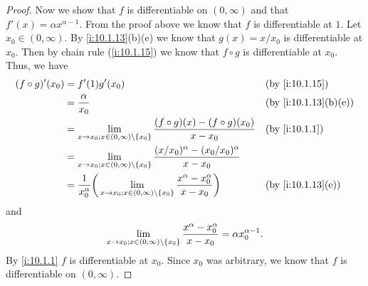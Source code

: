 \begin{proof}
  Now we show that \(f\) is differentiable on \((0, \infty)\) and that \(f'(x) = \alpha x^{\alpha - 1}\).
  From the proof above we know that \(f\) is differentiable at \(1\).
  Let \(x_0 \in (0, \infty)\).
  By \cref{i:10.1.13}(b)(e) we know that \(g(x) = x / x_0\) is differentiable at \(x_0\).
  Then by chain rule (\cref{i:10.1.15}) we know that \(f \circ g\) is differentiable at \(x_0\).
  Thus, we have
  \begin{align*}
    (f \circ g)'(x_0) & = f'(1) g'(x_0)                                                                                                                           &  & \by{i:10.1.15}      \\
                      & = \dfrac{\alpha}{x_0}                                                                                                                     &  & \by{i:10.1.13}[b,e] \\
                      & = \lim_{x \to x_0 ; x \in (0, \infty) \setminus \set{x_0}} \dfrac{(f \circ g)(x) - (f \circ g)(x_0)}{x - x_0}                             &  & \by{i:10.1.1}       \\
                      & = \lim_{x \to x_0 ; x \in (0, \infty) \setminus \set{x_0}} \dfrac{(x / x_0)^{\alpha} - (x_0 / x_0)^{\alpha}}{x - x_0}                                              \\
                      & = \dfrac{1}{x_0^{\alpha}} \bigg(\lim_{x \to x_0 ; x \in (0, \infty) \setminus \set{x_0}} \dfrac{x^{\alpha} - x_0^{\alpha}}{x - x_0}\bigg) &  & \by{i:10.1.13}[e]
  \end{align*}
  and
  \[
    \lim_{x \to x_0 ; x \in (0, \infty) \setminus \left\lbrace x_0\right\rbrace} \dfrac{x^{\alpha} - x_0^{\alpha}}{x - x_0} = \alpha x_0^{\alpha - 1}.
  \]
  By \cref{i:10.1.1} \(f\) is differentiable at \(x_0\).
  Since \(x_0\) was arbitrary, we know that \(f\) is differentiable on \((0, \infty)\).
\end{proof}
